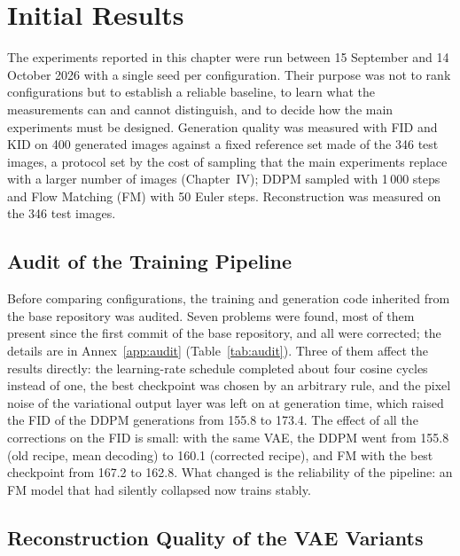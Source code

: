 \renewcommand{\baselinestretch}{1.5}

\chapter{Initial Results}

The experiments reported in this chapter were run between 15 September and 14 October 2026 with a single seed per configuration. Their purpose was not to rank configurations but to establish a reliable baseline, to learn what the measurements can and cannot distinguish, and to decide how the main experiments must be designed. Generation quality was measured with FID and KID on 400 generated images against a fixed reference set made of the 346 test images, a protocol set by the cost of sampling that the main experiments replace with a larger number of images (Chapter~IV); DDPM sampled with 1\,000 steps and Flow Matching (FM) with 50 Euler steps. Reconstruction was measured on the 346 test images.

\section{Audit of the Training Pipeline}

Before comparing configurations, the training and generation code inherited from the base repository was audited. Seven problems were found, most of them present since the first commit of the base repository, and all were corrected; the details are in Annex~\ref{app:audit} (Table~\ref{tab:audit}). Three of them affect the results directly: the learning-rate schedule completed about four cosine cycles instead of one, the best checkpoint was chosen by an arbitrary rule, and the pixel noise of the variational output layer was left on at generation time, which raised the FID of the DDPM generations from 155.8 to 173.4. The effect of all the corrections on the FID is small: with the same VAE, the DDPM went from 155.8 (old recipe, mean decoding) to 160.1 (corrected recipe), and FM with the best checkpoint from 167.2 to 162.8. What changed is the reliability of the pipeline: an FM model that had silently collapsed now trains stably.

\section{Reconstruction Quality of the VAE Variants}

